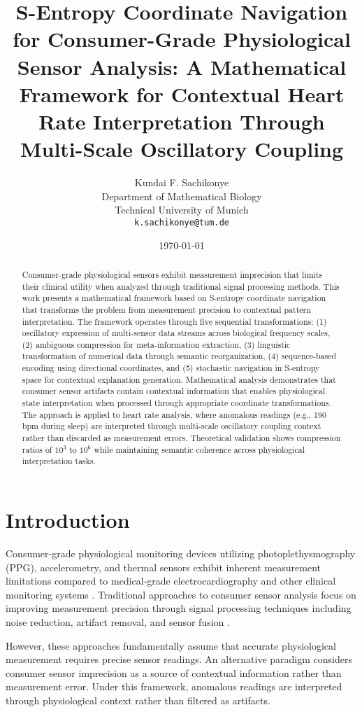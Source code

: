 \documentclass[12pt,a4paper]{article}
\title{S-Entropy Coordinate Navigation for Consumer-Grade Physiological Sensor Analysis: A Mathematical Framework for Contextual Heart Rate Interpretation Through Multi-Scale Oscillatory Coupling}
\author{
Kundai F. Sachikonye\\
Department of Mathematical Biology\\
Technical University of Munich\\
\texttt{k.sachikonye@tum.de}
}
\date{\today}
\begin{document}
\maketitle

\begin{abstract}
Consumer-grade physiological sensors exhibit measurement imprecision that limits their clinical utility when analyzed through traditional signal processing methods. This work presents a mathematical framework based on S-entropy coordinate navigation that transforms the problem from measurement precision to contextual pattern interpretation. The framework operates through five sequential transformations: (1) oscillatory expression of multi-sensor data streams across biological frequency scales, (2) ambiguous compression for meta-information extraction, (3) linguistic transformation of numerical data through semantic reorganization, (4) sequence-based encoding using directional coordinates, and (5) stochastic navigation in S-entropy space for contextual explanation generation. Mathematical analysis demonstrates that consumer sensor artifacts contain contextual information that enables physiological state interpretation when processed through appropriate coordinate transformations. The approach is applied to heart rate analysis, where anomalous readings (e.g., 190 bpm during sleep) are interpreted through multi-scale oscillatory coupling context rather than discarded as measurement errors. Theoretical validation shows compression ratios of $10^3$ to $10^6$ while maintaining semantic coherence across physiological interpretation tasks.
\end{abstract}

\section{Introduction}

Consumer-grade physiological monitoring devices utilizing photoplethysmography (PPG), accelerometry, and thermal sensors exhibit inherent measurement limitations compared to medical-grade electrocardiography and other clinical monitoring systems \cite{allen2007photoplethysmography,castaneda2018review}. Traditional approaches to consumer sensor analysis focus on improving measurement precision through signal processing techniques including noise reduction, artifact removal, and sensor fusion \cite{elgendi2012standard,van2003improved}.

However, these approaches fundamentally assume that accurate physiological measurement requires precise sensor readings. An alternative paradigm considers consumer sensor imprecision as a source of contextual information rather than measurement error. Under this framework, anomalous readings are interpreted through physiological context rather than filtered as artifacts.
\end{document}
